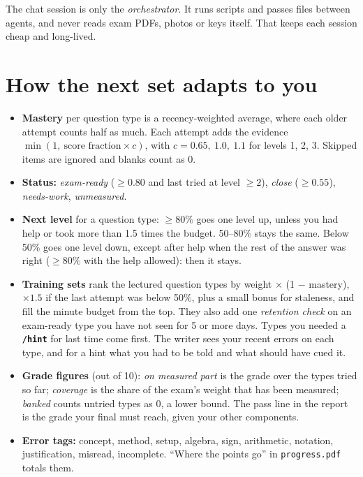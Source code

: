 \documentclass[a4paper,10pt]{article}
\newcommand{\cmd}[1]{\texttt{\bfseries #1}}
\begin{document}
\smallskip
The chat session is only the \emph{orchestrator}. It runs scripts and passes files between agents,
and never reads exam PDFs, photos or keys itself. That keeps each session cheap and long-lived.

\section{How the next set adapts to you}

\begin{itemize}[leftmargin=1.1em]
  \item \textbf{Mastery} per question type is a recency-weighted average, where each older attempt
    counts half as much. Each attempt adds the evidence $\min(1,\ \text{score fraction}\times c)$,
    with $c = 0.65,\ 1.0,\ 1.1$ for levels 1, 2, 3. Skipped items are ignored and blanks count as 0.
  \item \textbf{Status:} \emph{exam-ready} ($\geq 0.80$ and last tried at level $\geq 2$),
    \emph{close} ($\geq 0.55$), \emph{needs-work}, \emph{unmeasured}.
  \item \textbf{Next level} for a question type: $\geq 80\%$ goes one level up, unless you had help
    or took more than 1.5 times the budget. 50--80\% stays the same. Below 50\% goes one level down,
    except after help when the rest of the answer was right ($\geq 80\%$ with the help allowed): then it stays.
  \item \textbf{Training sets} rank the lectured question types by
    weight $\times$ (1 $-$ mastery), $\times 1.5$ if the last attempt was below 50\%, plus a small
    bonus for staleness, and fill the minute budget from the top. They also add one
    \emph{retention check} on an exam-ready type you have not seen for 5 or more days. Types you
    needed a \cmd{/hint} for last time come first. The writer sees your recent errors on each type,
    and for a hint what you had to be told and what should have cued it.
  \item \textbf{Grade figures} (out of 10): \emph{on measured part} is the grade over the types tried so far;
    \emph{coverage} is the share of the exam's weight that has been measured; \emph{banked} counts untried types as 0, a lower bound.
    The pass line in the report is the grade your final must reach, given your other components.
  \item \textbf{Error tags:} concept, method, setup, algebra, sign, arithmetic, notation,
    justification, misread, incomplete. ``Where the points go'' in \texttt{progress.pdf} totals them.
\end{itemize}
\end{document}
